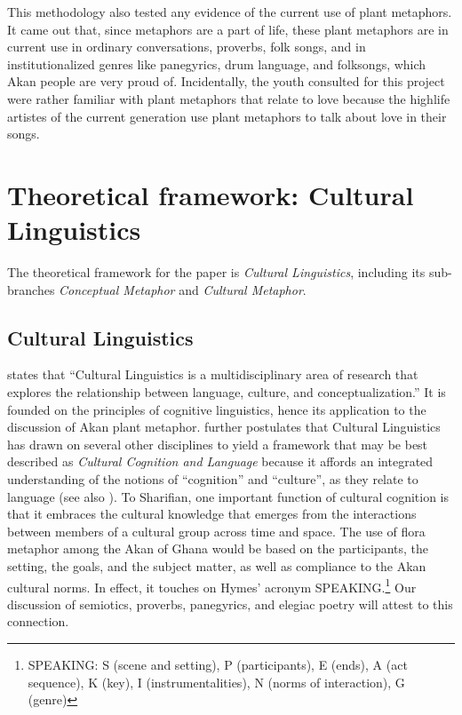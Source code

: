 \documentclass[output=paper,colorlinks,citecolor=brown]{langscibook}
\begin{document}
This methodology also tested any evidence of the current use of plant metaphors. It came out that, since metaphors are a part of life, these plant metaphors are in current use in ordinary conversations, proverbs, folk songs, and in institutionalized genres like panegyrics, drum language, and folksongs, which Akan people are very proud of. Incidentally, the youth consulted for this project were rather familiar with plant metaphors that relate to love because the highlife artistes of the current generation use plant metaphors to talk about love in their songs.

\section{Theoretical framework: Cultural Linguistics} \label{07_Theoretical}

The theoretical framework for the paper is \textit{Cultural Linguistics}, including its sub-branches \textit{Conceptual Metaphor} and \textit{Cultural Metaphor}. 

\subsection{Cultural Linguistics}

\citet[473]{Sharifian2015} states that ``Cultural Linguistics is a multidisciplinary area of research that explores the relationship between language, culture, and conceptualization.'' It is founded on the principles of cognitive linguistics, hence its application to the discussion of Akan plant metaphor. \citet[476]{Sharifian2015} further postulates that Cultural Linguistics has drawn on several other disciplines to yield a framework that may be best described as \textit{Cultural Cognition and Language} because it affords an integrated understanding of the notions of ``cognition” and ``culture'', as they relate to language (see also \citealt{Sharifian2011}). To Sharifian, one important function of cultural cognition is that it embraces the cultural knowledge that emerges from the interactions between members of a cultural group across time and space. The use of flora metaphor among the Akan of Ghana would be based on the participants, the setting, the goals, and the subject matter, as well as compliance to the Akan cultural norms. In effect, it touches on Hymes’ \citeyearpar{Hymes1972} acronym SPEAKING.\footnote{SPEAKING: S (scene and setting), P (participants), E (ends), A (act sequence), K (key), I (instrumentalities), N (norms of interaction), G (genre)} Our discussion of semiotics, proverbs, panegyrics, and elegiac poetry will attest to this connection.
\end{document}
